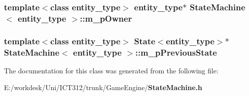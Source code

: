 \subsubsection[{m\+\_\+p\+Owner}]{\setlength{\rightskip}{0pt plus 5cm}template$<$class entity\+\_\+type$>$ entity\+\_\+type$\ast$ {\bf State\+Machine}$<$ entity\+\_\+type $>$\+::m\+\_\+p\+Owner\hspace{0.3cm}{\ttfamily [private]}}\label{class_state_machine_a05e9bb467c5fe7bc932cf4692767592c}
\subsubsection[{m\+\_\+p\+Previous\+State}]{\setlength{\rightskip}{0pt plus 5cm}template$<$class entity\+\_\+type$>$ {\bf State}$<$entity\+\_\+type$>$$\ast$ {\bf State\+Machine}$<$ entity\+\_\+type $>$\+::m\+\_\+p\+Previous\+State\hspace{0.3cm}{\ttfamily [private]}}\label{class_state_machine_ac8cd65b781af4078b86851855ab2443c}


The documentation for this class was generated from the following file\+:\begin{DoxyCompactItemize}
\item 
E\+:/workdesk/\+Uni/\+I\+C\+T312/trunk/\+Game\+Engine/{\bf State\+Machine.\+h}\end{DoxyCompactItemize}
